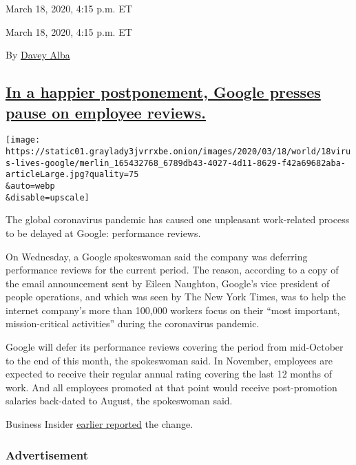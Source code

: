 March 18, 2020, 4:15 p.m. ET

March 18, 2020, 4:15 p.m. ET

By \href{https://www.nytimes3xbfgragh.onion/by/davey-alba}{Davey Alba}

\hypertarget{in-a-happier-postponement-google-presses-pause-on-employee-reviews}{%
\subsection{\texorpdfstring{\protect\hyperlink{in-a-happier-postponement-google-presses-pause-on-employee-reviews}{In
a happier postponement, Google presses pause on employee
reviews.}}{In a happier postponement, Google presses pause on employee reviews.}}\label{in-a-happier-postponement-google-presses-pause-on-employee-reviews}}

\texttt{[image: https://static01.graylady3jvrrxbe.onion/images/2020/03/18/world/18virus-lives-google/merlin\_165432768\_6789db43-4027-4d11-8629-f42a69682aba-articleLarge.jpg?quality=75\\\&auto=webp\\\&disable=upscale]}

The global coronavirus pandemic has caused one unpleasant work-related
process to be delayed at Google: performance reviews.

On Wednesday, a Google spokeswoman said the company was deferring
performance reviews for the current period. The reason, according to a
copy of the email announcement sent by Eileen Naughton, Google's vice
president of people operations, and which was seen by The New York
Times, was to help the internet company's more than 100,000 workers
focus on their ``most important, mission-critical activities'' during
the coronavirus pandemic.

Google will defer its performance reviews covering the period from
mid-October to the end of this month, the spokeswoman said. In November,
employees are expected to receive their regular annual rating covering
the last 12 months of work. And all employees promoted at that point
would receive post-promotion salaries back-dated to August, the
spokeswoman said.

Business Insider
\href{https://www.businessinsider.com/google-delays-employee-performance-reviews-promotions-covid-19-2020-3}{earlier
reported} the change.

\hypertarget{advertisement-4}{%
\subsubsection{Advertisement}\label{advertisement-4}}


